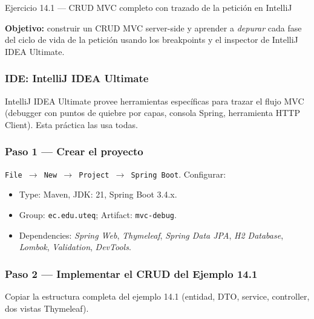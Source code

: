 \documentclass[11pt,a4paper,openany]{book}
\begin{document}
\begin{cajaejercicio}{Ejercicio 14.1 --- CRUD MVC completo con trazado de la petición en IntelliJ}

\textbf{Objetivo:} construir un CRUD MVC server-side y aprender a
\emph{depurar} cada fase del ciclo de vida de la petición usando los
breakpoints y el inspector de IntelliJ IDEA Ultimate.

\subsubsection*{IDE: IntelliJ IDEA Ultimate}

IntelliJ IDEA Ultimate provee herramientas específicas para
trazar el flujo MVC (debugger con puntos de quiebre por capas,
consola Spring, herramienta HTTP Client). Esta práctica las usa
todas.


\subsubsection*{Paso 1 --- Crear el proyecto}

\texttt{File $\rightarrow$ New $\rightarrow$ Project $\rightarrow$
Spring Boot}. Configurar:
\begin{itemize}
\item Type: Maven, JDK: 21, Spring Boot 3.4.x.
\item Group: \texttt{ec.edu.uteq}; Artifact: \texttt{mvc-debug}.
\item Dependencies: \emph{Spring Web}, \emph{Thymeleaf}, \emph{Spring
Data JPA}, \emph{H2 Database}, \emph{Lombok}, \emph{Validation},
\emph{DevTools}.
\end{itemize}

\subsubsection*{Paso 2 --- Implementar el CRUD del Ejemplo 14.1}

Copiar la estructura completa del ejemplo 14.1 (entidad, DTO,
service, controller, dos vistas Thymeleaf).


\end{cajaejercicio}
\end{document}
